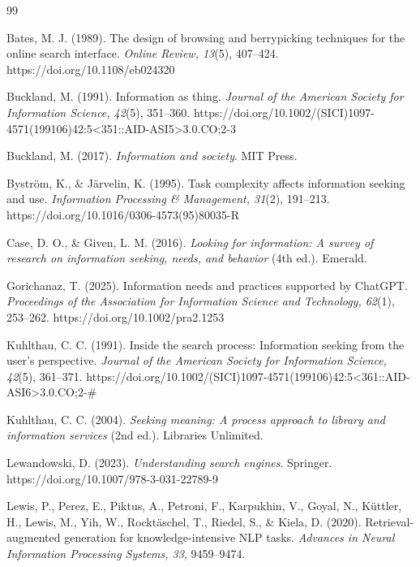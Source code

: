 \documentclass{isi2027}
\begin{document}
\begin{thebibliography}{99}

Bates, M. J. (1989). The design of browsing and berrypicking techniques for the online search interface. \textit{Online Review, 13}(5), 407--424. https://doi.org/10.1108/eb024320

Buckland, M. (1991). Information as thing. \textit{Journal of the American Society for Information Science, 42}(5), 351--360. https://doi.org/10.1002/(SICI)1097-4571(199106)42:5\textless351::AID-ASI5\textgreater3.0.CO;2-3

Buckland, M. (2017). \textit{Information and society}. MIT Press.

Bystr\"{o}m, K., \& J\"{a}rvelin, K. (1995). Task complexity affects information seeking and use. \textit{Information Processing \& Management, 31}(2), 191--213. https://doi.org/10.1016/0306-4573(95)80035-R

Case, D. O., \& Given, L. M. (2016). \textit{Looking for information: A survey of research on information seeking, needs, and behavior} (4th ed.). Emerald.

Gorichanaz, T. (2025). Information needs and practices supported by ChatGPT. \textit{Proceedings of the Association for Information Science and Technology, 62}(1), 253--262. https://doi.org/10.1002/pra2.1253

Kuhlthau, C. C. (1991). Inside the search process: Information seeking from the user's perspective. \textit{Journal of the American Society for Information Science, 42}(5), 361--371. https://doi.org/10.1002/(SICI)1097-4571(199106)42:5\textless361::AID-ASI6\textgreater3.0.CO;2-\#

Kuhlthau, C. C. (2004). \textit{Seeking meaning: A process approach to library and information services} (2nd ed.). Libraries Unlimited.

Lewandowski, D. (2023). \textit{Understanding search engines}. Springer. https://doi.org/10.1007/978-3-031-22789-9

Lewis, P., Perez, E., Piktus, A., Petroni, F., Karpukhin, V., Goyal, N., K\"{u}ttler, H., Lewis, M., Yih, W., Rockt\"{a}schel, T., Riedel, S., \& Kiela, D. (2020). Retrieval-augmented generation for knowledge-intensive NLP tasks. \textit{Advances in Neural Information Processing Systems, 33}, 9459--9474.


\end{thebibliography}
\end{document}
